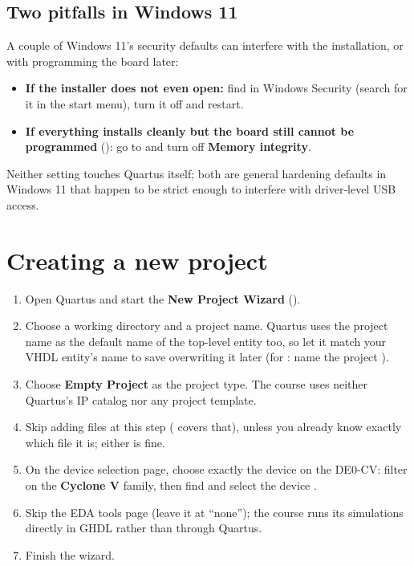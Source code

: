 \subsection{Two pitfalls in Windows 11}
\label{app:quartus:win11}

A couple of Windows 11's security defaults can interfere with the installation, or with programming
the board later:

\begin{itemize}
  \item \textbf{If the installer does not even open:} find  in Windows
    Security (search for it in the start menu), turn it off and restart.
  \item \textbf{If everything installs cleanly but the board still cannot be programmed}
    (): go to 
    and turn off \textbf{Memory integrity}.
\end{itemize}


Neither setting touches Quartus itself; both are general hardening defaults in Windows 11 that happen
to be strict enough to interfere with driver-level USB access.

\section{Creating a new project}
\label{app:quartus:project}

\begin{enumerate}
  \item Open Quartus and start the \textbf{New Project Wizard} ().
  \item Choose a working directory and a project name. Quartus uses the project name as the default
    name of the top-level entity too, so let it match your VHDL entity's name to save overwriting it
    later (for : name the project ).
  \item Choose \textbf{Empty Project} as the project type. The course uses neither Quartus's IP
    catalog nor any project template.
  \item Skip adding files at this step ( covers that), unless you already
    know exactly which file it is; either is fine.
  \item On the device selection page, choose exactly the device on the DE0-CV: filter on the
    \textbf{Cyclone V} family, then find and select the device .
  \item Skip the EDA tools page (leave it at ``none''); the course runs its simulations directly in
    GHDL rather than through Quartus.
  \item Finish the wizard.
\end{enumerate}

